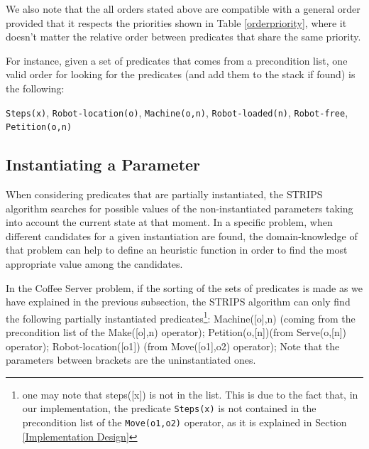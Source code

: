 \documentclass[12pt,a4paper,oneside]{article}
\numberwithin{equation}{section}
\numberwithin{equation}{section}
\theoremstyle{definition}
\begin{document}
We also note that the all orders stated above are compatible with a general order provided that it respects the priorities shown in Table \ref{orderpriority}, where it doesn’t matter the relative order between predicates that share the same priority. 

\begin{table}[]
\centering
{}
\caption{Preferences that must satisfy a general order.}
\label{orderpriority}
\end{table}

For instance, given a set of predicates that comes from a precondition list, one valid order for looking for the predicates (and add them to the stack if found) is the following:

\texttt{Steps(x)}, \texttt{Robot-location(o)}, \texttt{Machine(o,n)}, \texttt{Robot-loaded(n)}, \texttt{Robot-free}, \texttt{Petition(o,n)}


\subsection{Instantiating a Parameter} \label{Instantiating a Parameter}

When considering predicates that are partially instantiated, the STRIPS algorithm searches for possible values of the non-instantiated parameters taking into account the current state at that moment. In a specific problem, when different candidates for a given instantiation are found, the domain-knowledge of that problem can help to define an heuristic function in order to find the most appropriate value among the candidates.


In the Coffee Server problem, if the sorting of the sets of predicates is made as we have explained in the previous subsection, the STRIPS algorithm can only find the following partially instantiated predicates\footnote{one may note that steps([x]) is not in the list. This is due to the fact that, in our implementation, the predicate \texttt{Steps(x)} is not contained in the precondition list of the \texttt{Move(o1,o2)} operator, as it is explained in Section \ref{Implementation Design}}:
Machine([o],n) (coming from the precondition list of the Make([o],n) operator);
Petition(o,[n])(from Serve(o,[n]) operator);
Robot-location([o1]) (from Move([o1],o2) operator);
Note that the parameters between brackets are the uninstantiated ones.
\end{document}
